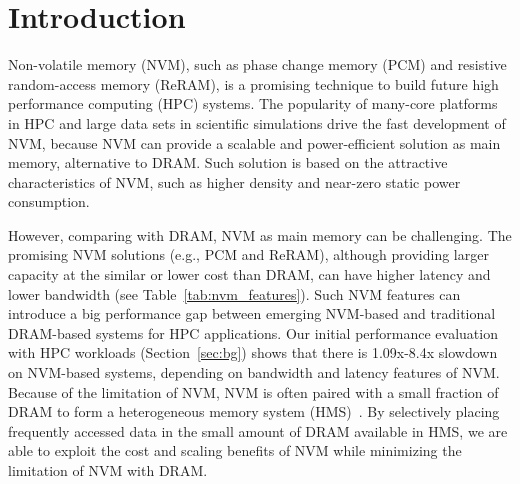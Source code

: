 \section{Introduction}
\label{sec:intro}
Non-volatile memory (NVM), such as phase change memory (PCM) and resistive random-access memory (ReRAM), is a promising technique to build future high performance computing (HPC) systems.
The popularity of many-core platforms in HPC %
and large data sets in scientific simulations drive the fast development of NVM,
because NVM can provide a scalable and power-efficient solution as main memory,
alternative to DRAM.
Such solution is based on the attractive characteristics of NVM, such as higher density and near-zero static power consumption.

However, comparing with DRAM, NVM as main memory can be challenging.
The promising NVM solutions (e.g., PCM and ReRAM), 
although providing larger capacity at the similar or lower cost than DRAM,
can have higher latency and lower bandwidth (see Table~\ref{tab:nvm_features}).
Such NVM features can introduce a big performance gap between emerging NVM-based and traditional DRAM-based systems for HPC applications. 
Our initial performance evaluation with HPC workloads (Section~\ref{sec:bg}) shows that there is 1.09x-8.4x slowdown on NVM-based systems, depending on bandwidth and latency features of NVM.
Because of the limitation of NVM, NVM is often paired with a small fraction of DRAM to form a heterogeneous memory system (HMS)~\cite{eurosys16:dulloor, nas16:giardino, asplos16:lin, ismm16:shen, gpu_pcm_pact13, hpdc16:wu}.
By selectively placing frequently accessed data in the small amount of DRAM available in HMS, we are able to exploit the cost and scaling benefits of NVM while minimizing the limitation of NVM with DRAM.

\begin{comment}
The emergence of the NVM-based HMS breaks the uniformity in the traditional memory system:
As a result, the existing system must be evolved to handle such memory heterogeneity.
Data objects of the application must be carefully placed to NVM and DRAM
for best performance.
\end{comment}

